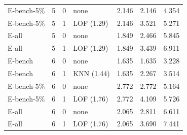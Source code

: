 \begin{table}[t]
\begin{tabular}{lrrlrrr}
E-bench-5\% & 5 & 0 & none & 2.146 & 2.146 & 4.354 \\
E-bench-5\% & 5 & 1 & LOF (1.29) & 2.146 & 3.521 & 5.271 \\
E-all & 5 & 0 & none & 1.849 & 2.466 & 5.845 \\
E-all & 5 & 1 & LOF (1.29) & 1.849 & 3.439 & 6.911 \\
E-bench & 6 & 0 & none & 1.635 & 1.635 & 3.228 \\
E-bench & 6 & 1 & KNN (1.44) & 1.635 & 2.267 & 3.514 \\
E-bench-5\% & 6 & 0 & none & 2.772 & 2.772 & 5.164 \\
E-bench-5\% & 6 & 1 & LOF (1.76) & 2.772 & 4.109 & 5.726 \\
E-all & 6 & 0 & none & 2.065 & 2.811 & 6.611 \\
E-all & 6 & 1 & LOF (1.76) & 2.065 & 3.690 & 7.441 \\
\bottomrule
\end{tabular}
\end{table}
